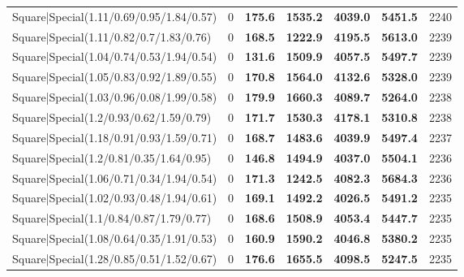 \begin{tabular}{lrllllr}
 Square|Special(1.11/0.69/0.95/1.84/0.57)                      &             0   & \textbf{175.6} & \textbf{1535.2} & \textbf{4039.0} & \textbf{5451.5} &         2240 \\
 Square|Special(1.11/0.82/0.7/1.83/0.76)                       &             0   & \textbf{168.5} & \textbf{1222.9} & \textbf{4195.5} & \textbf{5613.0} &         2239 \\
 Square|Special(1.04/0.74/0.53/1.94/0.54)                      &             0   & \textbf{131.6} & \textbf{1509.9} & \textbf{4057.5} & \textbf{5497.7} &         2239 \\
 Square|Special(1.05/0.83/0.92/1.89/0.55)                      &             0   & \textbf{170.8} & \textbf{1564.0} & \textbf{4132.6} & \textbf{5328.0} &         2239 \\
 Square|Special(1.03/0.96/0.08/1.99/0.58)                      &             0   & \textbf{179.9} & \textbf{1660.3} & \textbf{4089.7} & \textbf{5264.0} &         2238 \\
 Square|Special(1.2/0.93/0.62/1.59/0.79)                       &             0   & \textbf{171.7} & \textbf{1530.3} & \textbf{4178.1} & \textbf{5310.8} &         2238 \\
 Square|Special(1.18/0.91/0.93/1.59/0.71)                      &             0   & \textbf{168.7} & \textbf{1483.6} & \textbf{4039.9} & \textbf{5497.4} &         2237 \\
 Square|Special(1.2/0.81/0.35/1.64/0.95)                       &             0   & \textbf{146.8} & \textbf{1494.9} & \textbf{4037.0} & \textbf{5504.1} &         2236 \\
 Square|Special(1.06/0.71/0.34/1.94/0.54)                      &             0   & \textbf{171.3} & \textbf{1242.5} & \textbf{4082.3} & \textbf{5684.3} &         2236 \\
 Square|Special(1.02/0.93/0.48/1.94/0.61)                      &             0   & \textbf{169.1} & \textbf{1492.2} & \textbf{4026.5} & \textbf{5491.2} &         2235 \\
 Square|Special(1.1/0.84/0.87/1.79/0.77)                       &             0   & \textbf{168.6} & \textbf{1508.9} & \textbf{4053.4} & \textbf{5447.7} &         2235 \\
 Square|Special(1.08/0.64/0.35/1.91/0.53)                      &             0   & \textbf{160.9} & \textbf{1590.2} & \textbf{4046.8} & \textbf{5380.2} &         2235 \\
 Square|Special(1.28/0.85/0.51/1.52/0.67)                      &             0   & \textbf{176.6} & \textbf{1655.5} & \textbf{4098.5} & \textbf{5247.5} &         2235 \\

\end{tabular}
